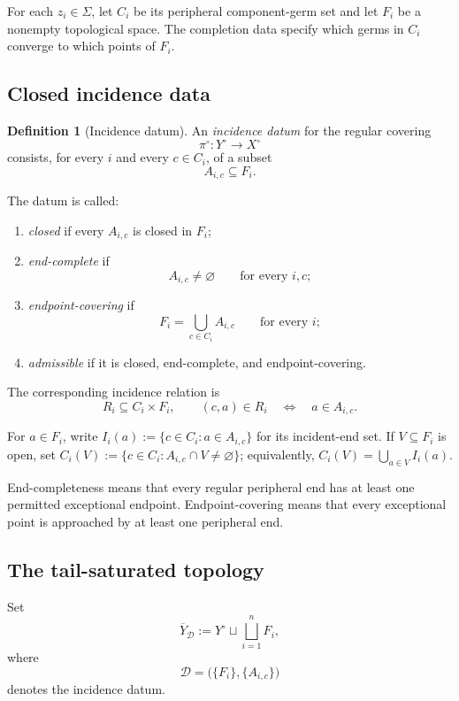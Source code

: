 \documentclass[11pt]{article}
\theoremstyle{plain}
\theoremstyle{definition}
\newtheorem{definition}[theorem]{Definition}
\begin{document}
For each $z_i\in\Sigma$, let $C_i$ be its peripheral component-germ set and let
$F_i$ be a nonempty topological space.  The completion data specify which germs in
$C_i$ converge to which points of $F_i$.

\subsection{Closed incidence data}
\label{subsec:closed-incidence-data}

\begin{definition}[Incidence datum]
\label{def:incidence-datum}
An \emph{incidence datum} for the regular covering
\[
\pi^\circ:Y^\circ\to X^\circ
\]
consists, for every $i$ and every $c\in C_i$, of a subset
\[
A_{i,c}\subseteq F_i.
\]

The datum is called:
\begin{enumerate}[label=(\roman*)]
\item \emph{closed} if every $A_{i,c}$ is closed in $F_i$;
\item \emph{end-complete} if
\[
A_{i,c}\neq\varnothing
\qquad
\text{for every }i,c;
\]
\item \emph{endpoint-covering} if
\[
F_i=\bigcup_{c\in C_i}A_{i,c}
\qquad
\text{for every }i;
\]
\item \emph{admissible} if it is closed, end-complete, and endpoint-covering.
\end{enumerate}
\end{definition}

The corresponding incidence relation is
\[
R_i\subseteq C_i\times F_i,
\qquad
(c,a)\in R_i
\quad\Longleftrightarrow\quad
a\in A_{i,c}.
\]

For $a\in F_i$, write $I_i(a):=\{c\in C_i:a\in A_{i,c}\}$ for its
incident-end set.  If $V\subseteq F_i$ is open, set
$C_i(V):=\{c\in C_i:A_{i,c}\cap V\neq\varnothing\}$; equivalently,
$C_i(V)=\bigcup_{a\in V}I_i(a)$.

End-completeness means that every regular peripheral end has at least one
permitted exceptional endpoint.  Endpoint-covering means that every exceptional
point is approached by at least one peripheral end.

\subsection{The tail-saturated topology}
\label{subsec:tail-saturated-topology}

Set
\[
\overline Y_{\mathcal D}
:=
Y^\circ
\sqcup
\bigsqcup_{i=1}^nF_i,
\]
where
\[
\mathcal D
=
\bigl(\{F_i\},\{A_{i,c}\}\bigr)
\]
denotes the incidence datum.
\end{document}

